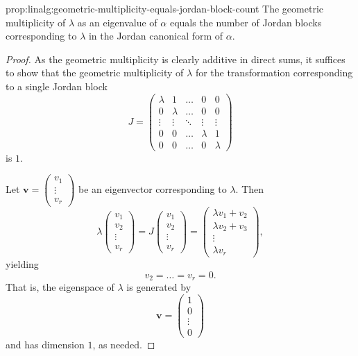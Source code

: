 \begin{prop}{}{prop:linalg:geometric-multiplicity-equals-jordan-block-count}
  The geometric multiplicity of $\lambda$ as an eigenvalue of $\alpha$
  equals the number of Jordan blocks corresponding to $\lambda$ in the
  Jordan canonical form of $\alpha$.
\end{prop}

\begin{proof}
  As the geometric multiplicity is clearly additive in direct sums, it
  suffices to show that the geometric multiplicity of $\lambda$ for
  the transformation corresponding to a single Jordan block
  \[
    J = \begin{pmatrix}
      \lambda & 1 & \dots & 0 & 0 \\
      0 & \lambda & \dots & 0 & 0 \\
      \vdots & \vdots & \ddots & \vdots & \vdots \\
      0 & 0 & \dots & \lambda & 1 \\
      0 & 0 & \dots & 0 & \lambda
    \end{pmatrix}
  \]
  is $1$.

  Let
  $\mathbf{v} = \begin{pmatrix} v_1 \\ \vdots \\ v_r \end{pmatrix}$ be
  an eigenvector corresponding to $\lambda$. Then
  \[
    \lambda \begin{pmatrix} v_1 \\ v_2 \\ \vdots \\ v_r \end{pmatrix}
    = J \begin{pmatrix} v_1 \\ v_2 \\ \vdots \\ v_r \end{pmatrix} =
    \begin{pmatrix} \lambda v_1 + v_2 \\ \lambda v_2 + v_3 \\ \vdots \\
      \lambda v_r \end{pmatrix},
  \]
  yielding
  \[
    v_2 = \dots = v_r = 0.
  \]
  That is, the eigenspace of $\lambda$ is generated by
  \[
    \mathbf{v} = \begin{pmatrix} 1 \\ 0 \\ \vdots \\ 0 \end{pmatrix}
  \]
  and has dimension $1$, as needed.
\end{proof}

